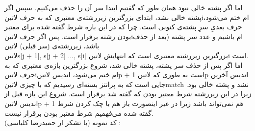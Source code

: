 اما اگر پشته خالی نبود همان طور که گفتیم ابتدا سر آن را حذف می‌کنیم. سپس اگر پشته خالی نشد، ابتدای بزرگترین زیررشته‌ی معتبری که به حرف ‌لاتین{i}ام ختم می‌‌شود، حرف بعدیِ سرِ پشته‌ی کنونی است. چرا که در این بازه شرط گفته شده برای معتبر بودن رشته برقرار است. پس اگر حرف ‌لاتین{i}ام باشیم و عدد سر پشته (بعد از حذف سر قبلی) ‌لاتین{j} باشد، زیررشته‌ی
\\ ‌لاتین{s[j + 1], s[j + 2] ..., s[i]} بزرگترین زیررشته معتبری است که انتهایش ‌لاتین{i} است.
\\اما اگر پس از حذف سر پشته، پشته خالی شد، شروع بزرگترین بازه‌ی معتبری که به حرف ‌لاتین{i}ام ختم می‌شود، اندیس ‌لاتین{p + 1} است به طوری که ‌لاتین{p} اندیس آخرین جایی است که به پرانتز بسته‌ای رسیدیم که با چیزی ‌لاتین{match} نشد و پشته خالی بود. زیرا در این زیررشته شرط معتبر بودن که گفته شد برقرار است. شروع این بازه قبل از اندیس ‌لاتین{p + 1} هم نمی‌تواند باشد زیرا در غیر اینصورت باز هم با چک کردن شرط گفته شده می‌فهمیم شرط معتبر بودن برقرار نیست.
‌\\کد نمونه (با تشکر از حمیدرضا کلباسی) :









